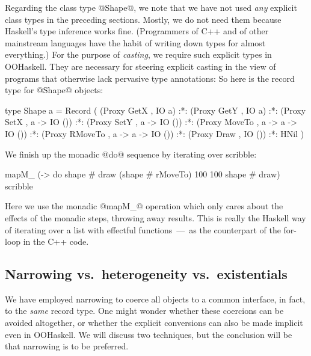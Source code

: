 Regarding the class type @Shape@, we note that we have not used
\emph{any} explicit class types in the preceding sections. Mostly, we
do not need them because Haskell's type inference works
fine. (Programmers of C++ and of other mainstream languages have
the habit of writing down types for almost everything.) For the
purpose of \emph{casting}, we require such explicit types in
OOHaskell. They are necessary for steering explicit casting in the
view of programs that otherwise lack pervasive type annotations: So
here is the record type for @Shape@ objects:

\begin{code}
 type Shape a = Record (  (Proxy GetX    , IO a)
                      :*: (Proxy GetY    , IO a)
                      :*: (Proxy SetX    , a -> IO ())
                      :*: (Proxy SetY    , a -> IO ())
                      :*: (Proxy MoveTo  , a -> a -> IO ())
                      :*: (Proxy RMoveTo , a -> a -> IO ())
                      :*: (Proxy Draw    , IO ())
                      :*: HNil )
\end{code}

We finish up the monadic @do@ sequence by iterating over scribble:

\begin{code}
       mapM_ (\shape -> do
                           shape # draw
                           (shape # rMoveTo) 100 100
                           shape # draw)
             scribble
\end{code}

\noindent
Here we use the monadic @mapM_@ operation which only cares about the
effects of the monadic steps, throwing away results. This is really
the Haskell way of iterating over a list with effectful
functions~---~as the counterpart of the for-loop in the C++ code.






\subsection{Narrowing vs.\ heterogeneity vs.\ existentials}

We have employed narrowing to coerce all objects to a common
interface, in fact, to the \emph{same} record type. One might wonder
whether these coercions can be avoided altogether, or whether the
explicit conversions can also be made implicit even in OOHaskell. We
will discuss two techniques, but the conclusion will be that narrowing
is to be preferred.

